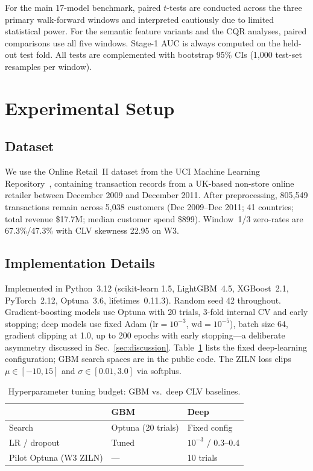 \documentclass[pdflatex,sn-mathphys-num]{sn-jnl}
\theoremstyle{thmstyleone}
\theoremstyle{thmstyletwo}
\theoremstyle{thmstylethree}
\begin{document}
For the main 17-model benchmark, paired $t$-tests are conducted across
the three primary walk-forward windows and interpreted cautiously due
to limited statistical power. For the semantic feature variants and
the CQR analyses, paired comparisons use all five windows. Stage-1
AUC is always computed on the held-out test fold. All tests are
complemented with bootstrap 95\% CIs (1{,}000 test-set resamples
per window).

\section{Experimental Setup}\label{sec:experiments}

\subsection{Dataset}

We use the Online Retail~II dataset from the UCI Machine Learning
Repository~\cite{chen2019online}, containing transaction records from a
UK-based non-store online retailer between December 2009 and December 2011.
After preprocessing, 805{,}549 transactions remain across 5{,}038
customers (Dec 2009--Dec 2011; 41 countries; total revenue
\$17.7M; median customer spend \$899). Window~1/3 zero-rates are
67.3\%/47.3\% with CLV skewness 22.95 on W3.

\subsection{Implementation Details}

Implemented in Python~3.12 (scikit-learn 1.5, LightGBM~4.5, XGBoost~2.1,
PyTorch~2.12, Optuna~3.6, lifetimes~0.11.3). Random seed 42 throughout.
Gradient-boosting models use Optuna with 20 trials, 3-fold internal CV
and early stopping; deep models use fixed Adam ($\mathrm{lr}=10^{-3}$,
$\mathrm{wd}=10^{-5}$), batch size 64, gradient clipping at 1.0, up to
200 epochs with early stopping---a deliberate asymmetry discussed in
Sec.~\ref{sec:discussion}. Table~\ref{tab:deep_hparams} lists the fixed
deep-learning configuration; GBM search spaces are in the public code.
The ZILN loss clips $\mu \in [-10,15]$ and $\sigma \in [0.01,3.0]$ via
softplus.

\begin{table}[t]
\caption{Hyperparameter tuning budget: GBM vs.\ deep CLV baselines.}
\label{tab:deep_hparams}
\scriptsize
\begin{tabular*}{\columnwidth}{@{\extracolsep\fill}lll@{}}
\toprule
 & \textbf{GBM} & \textbf{Deep} \\
\midrule
Search & Optuna (20 trials) & Fixed config \\
LR / dropout & Tuned & $10^{-3}$ / 0.3--0.4 \\
Pilot Optuna (W3 ZILN) & --- & 10 trials \\
\bottomrule
\end{tabular*}
\end{table}
\end{document}
